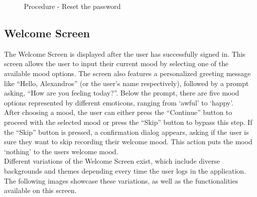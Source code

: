 \FloatBarrier
\begin{figure}[ht]\ContinuedFloat
    \centering
    \caption{Procedure - Reset the password}
\end{figure}
\FloatBarrier

\vspace{5mm}

\subsection{Welcome Screen}

The Welcome Screen is displayed after the user has successfully signed in. This screen allows the user to input their current mood by selecting one of the available mood options. The screen also features a personalized greeting message like ``Hello, Alexandros'' (or the user's name respectively), followed by a prompt asking, ``How are you feeling today?''. Below the prompt, there are five mood options represented by different emoticons, ranging from `awful' to `happy'.\vspace{5mm} \\
After choosing a mood, the user can either press the ``Continue'' button to proceed with the selected mood or press the ``Skip'' button to bypass this step. If the ``Skip'' button is pressed, a confirmation dialog appears, asking if the user is sure they want to skip recording their welcome mood. This action puts the mood `nothing' to the users welcome mood.\vspace{5mm} \\
Different variations of the Welcome Screen exist, which include diverse backgrounds and themes depending every time the user logs in the application. The following images showcase these variations, as well as the functionalities available on this screen.

\vspace{5mm}

